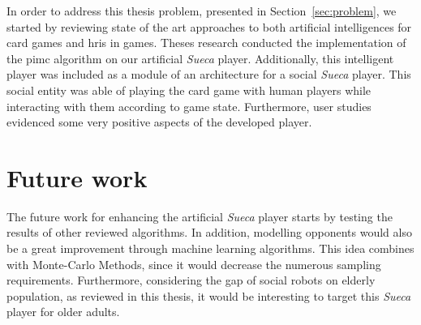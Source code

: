 \label{chapter:conclusion}

In order to address this thesis problem, presented in Section~\ref{sec:problem}, we started by reviewing state of the art approaches to both artificial intelligences for card games and \acp{hri} in games.
Theses research conducted the implementation of the \ac{pimc} algorithm on our artificial \emph{Sueca} player.
Additionally, this intelligent player was included as a module of an architecture for a social \emph{Sueca} player.
This social entity was able of playing the card game with human players while interacting with them according to game state.
Furthermore, user studies evidenced some very positive aspects of the developed player.

\section{Future work}
The future work for enhancing the artificial \emph{Sueca} player starts by testing the results of other reviewed algorithms.
In addition, modelling opponents would also be a great improvement through machine learning algorithms.
This idea combines with Monte-Carlo Methods, since it would decrease the numerous sampling requirements.
Furthermore, considering the gap of social robots on elderly population, as reviewed in this thesis, it would be interesting to target this \emph{Sueca} player for older adults.